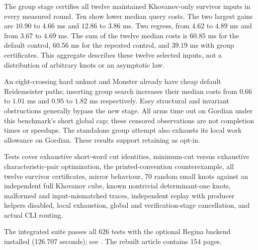 The group stage certifies all twelve maintained Khovanov-only survivor
inputs in every measured round.  Ten show lower median query costs.  The
two largest gains are $10.90$ to $4.66$ ms and $12.86$ to $3.86$ ms.
Two regress, from $4.62$ to $4.89$ ms and from $3.67$ to $4.69$ ms.
The sum of the twelve median costs is $60.85$ ms for the default control,
$60.56$ ms for the repeated control, and $39.19$ ms with group certificates.
This aggregate describes these twelve selected inputs, not a distribution
of arbitrary knots or an asymptotic law.

An eight-crossing hard unknot and Monster already have cheap default
Reidemeister paths; inserting group search increases their median costs
from $0.66$ to $1.01$ ms and $0.95$ to $1.82$ ms respectively.  Easy
structural and invariant obstructions generally bypass the new stage.
All arms time out on Gordian under this benchmark's short global cap;
these censored observations are not completion times or speedups.
The standalone group attempt also exhausts its local work allowance on
Gordian.  These results support retaining  as opt-in.

Tests cover exhaustive short-word cut identities, minimum-cut versus
exhaustive characteristic-pair optimization, the printed-convention
counterexample, all twelve survivor certificates, mirror behaviour,
70 random small knots against an independent full Khovanov cube, known
nontrivial determinant-one knots, malformed and input-mismatched traces,
independent replay with producer helpers disabled, local exhaustion,
global and verification-stage cancellation, and actual CLI routing.

The integrated suite passes all 626 tests with the optional Regina backend
installed (126.707 seconds); see
.  The rebuilt article
contains 154 pages.
